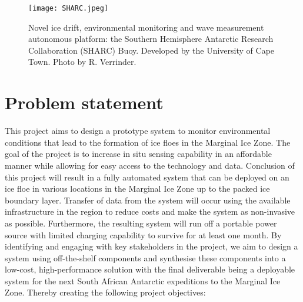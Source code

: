 \begin{figure}[H]
    \centering
    \texttt{[image: SHARC.jpeg]}
    \caption{Novel ice drift, environmental monitoring and wave measurement autonomous platform: the Southern Hemisphere Antarctic Research Collaboration (SHARC) Buoy. Developed by the University of Cape Town. Photo by R. Verrinder.}
    \label{fig:chapter1_sharc_buoy}
\end{figure}


\section{Problem statement}
\label{subsec:ch1.section2}

This project aims to design a prototype system to monitor environmental conditions that lead to the formation of ice floes in the Marginal Ice Zone. The goal of the project is to increase in situ sensing capability in an affordable manner while allowing for easy access to the technology and data. Conclusion of this project will result in a fully automated system that can be deployed on an ice floe in various locations in the Marginal Ice Zone up to the packed ice boundary layer. Transfer of data from the system will occur using the available infrastructure in the region to reduce costs and make the system as non-invasive as possible. Furthermore, the resulting system will run off a portable power source with limited charging capability to survive for at least one month. By identifying and engaging with key stakeholders in the project, we aim to design a system using off-the-shelf components and synthesise these components into a low-cost, high-performance solution with the final deliverable being a deployable system for the next South African Antarctic expeditions to the Marginal Ice Zone. Thereby creating the following project objectives:
